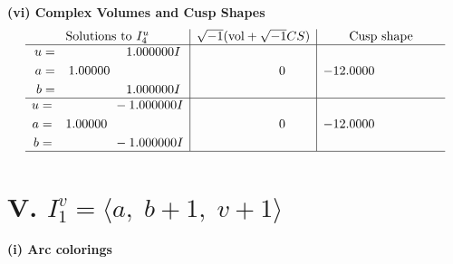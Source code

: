 \documentclass[1p]{elsarticle_modified}
\theoremstyle{definition}
\newcommand{\I}{\sqrt{-1}}
\begin{document}
\newpage\flushleft \textbf{(vi) Complex Volumes and Cusp Shapes}
$$\begin{array}{c|c|c}  
\text{Solutions to }I^u_{4}& \I (\text{vol} + \sqrt{-1}CS) & \text{Cusp shape}\\
 \hline 
\begin{aligned}
u &= \phantom{-0.000000 -}1.000000 I \\
a &= \phantom{-}1.00000\phantom{ +0.000000I} \\
b &= \phantom{-0.000000 -}1.000000 I\end{aligned}
 & \phantom{-0.000000 } 0 & -12.0000\phantom{ +0.000000I} \\ \hline\begin{aligned}
u &= \phantom{-0.000000 } -1.000000 I \\
a &= \phantom{-}1.00000\phantom{ +0.000000I} \\
b &= \phantom{-0.000000 } -1.000000 I\end{aligned}
 & \phantom{-0.000000 } 0 & -12.0000\phantom{ +0.000000I}\\
 \hline 
 \end{array}$$\newpage\newpage\renewcommand{\arraystretch}{1}
\centering \section*{V. $I^v_{1}= \langle a,\;b+1,\;v+1 \rangle$}
\flushleft \textbf{(i) Arc colorings}\\
\end{document}
